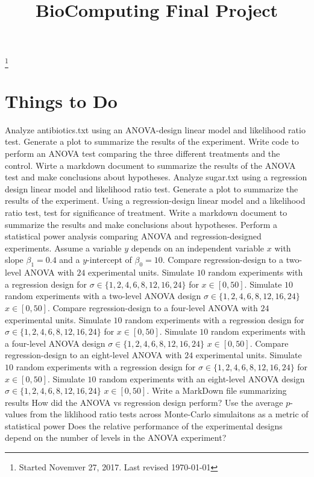 \documentclass[reqno, 11pt]{amsart}
\theoremstyle{definition}
\numberwithin{equation}{section}
\begin{document}
\title{BioComputing Final Project}
\thanks{Started Novemver 27, 2017. Last revised \today}

\maketitle

\section{Things to Do}

\begin{outline}
\1 Analyze antibiotics.txt using an ANOVA-design linear model and likelihood ratio test.
	\2 Generate a plot to summarize the results of the experiment.
	\2 Write code to perform an ANOVA test comparing the three different treatments and the control.
	\2 Wirte a markdown document to summarize the results of the ANOVA test and make conclusions about hypotheses.
\1 Analyze sugar.txt using a regression design linear model and likelihood ratio test.
	\2 Generate a plot to summarize the results of the experiment.
	\2 Using a regression-design linear model and a likelihood ratio test, test for significance of treatment.
	\2 Write a markdown document to summarize the results and make conclusions about hypotheses.
\1 Perform a statistical power analysis comparing ANOVA and regression-designed experiments.
	\2 Assume a variable $y$ depends on an independent variable $x$ with slope $\beta_1=0.4$ and a $y$-intercept of $\beta_0=10$.  
	\2 Compare regression-design to a two-level ANOVA with $24$ experimental units.
		\3 Simulate $10$ random experiments with a regression design for $\sigma\in\{1,2,4,6,8,12,16,24\}$ for $x\in[0,50]$.
		\3 Simulate $10$ random experiments with a two-level ANOVA design  $\sigma\in\{1,2,4,6,8,12,16,24\}$ $x\in[0,50]$.
	\2 Compare regression-design to a four-level ANOVA with $24$ experimental units.
		\3 Simulate $10$ random experiments with a regression design for $\sigma\in\{1,2,4,6,8,12,16,24\}$ for $x\in[0,50]$.
		\3 Simulate $10$ random experiments with a four-level ANOVA design  $\sigma\in\{1,2,4,6,8,12,16,24\}$ $x\in[0,50]$.	
	\2 Compare regression-design to an eight-level ANOVA with $24$ experimental units.
		\3 Simulate $10$ random experiments with a regression design for $\sigma\in\{1,2,4,6,8,12,16,24\}$ for $x\in[0,50]$.
		\3 Simulate $10$ random experiments with an eight-level ANOVA design  $\sigma\in\{1,2,4,6,8,12,16,24\}$ $x\in[0,50]$.
	\2 Write a MarkDown file summarizing results
		\3 How did the ANOVA vs regression design perform?
			\4 Use the average $p$-values from the liklihood ratio tests across Monte-Carlo simulaitons as a metric of statistical power
		\3 Does the relative performance of the experimental designs depend on the number of levels in the ANOVA experiment?
\end{outline}
\end{document}
